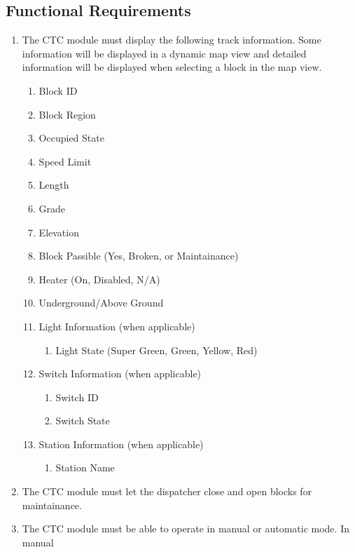 \documentclass{scrreprt}
\begin{document}
\subsection{Functional Requirements}
\begin{enumerate}
    \item The CTC module must display the following track information. Some information 
    will be displayed in a dynamic map view and detailed information will be displayed 
    when selecting a block in the map view.  
    \begin{enumerate}
        \item Block ID
        \item Block Region
        \item Occupied State
        \item Speed Limit
        \item Length
        \item Grade
        \item Elevation
        \item Block Passible (Yes, Broken, or Maintainance)
        \item Heater (On, Disabled, N/A)
        \item Underground/Above Ground
        \item Light Information (when applicable)
        \begin{enumerate}
            \item Light State (Super Green, Green, Yellow, Red)
        \end{enumerate}
        \item Switch Information (when applicable)
        \begin{enumerate}
            \item Switch ID
            \item Switch State
        \end{enumerate}
        \item Station Information (when applicable)
        \begin{enumerate}
            \item Station Name
        \end{enumerate}
    \end{enumerate}
    \item The CTC module must let the dispatcher close and open blocks for maintainance.
    \item The CTC module must be able to operate in manual or automatic mode. In manual 

\end{enumerate}
\end{document}
